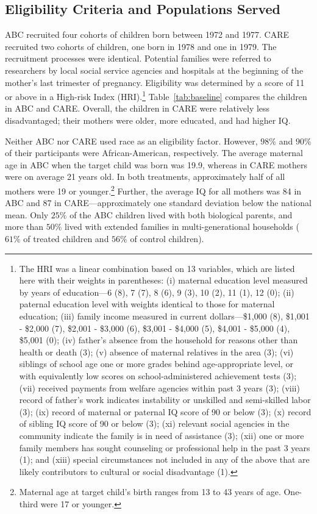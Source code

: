 \subsection{Eligibility Criteria and Populations Served} \label{section:eligibility}

\noindent ABC recruited four cohorts of children born between 1972 and 1977. CARE recruited two cohorts of children, one born in 1978 and one in 1979. The recruitment processes were identical. Potential families were referred to researchers by local social service agencies and hospitals at the beginning of the mother's last trimester of pregnancy. Eligibility was determined by a score of 11 or above in a High-risk Index (HRI).\footnote{The HRI was a linear combination based on 13 variables, which are listed here with their weights in parentheses: (i) maternal education level measured by years of education---6 (8), 7 (7), 8 (6), 9 (3), 10 (2), 11 (1), 12 (0); (ii) paternal education level with weights identical to those for maternal education; (iii) family income measured in current dollars---\$1,000 (8), \$1,001 - \$2,000 (7), \$2,001 - \$3,000 (6), \$3,001 - \$4,000 (5), \$4,001 - \$5,000 (4), \$5,001 (0); (iv) father's absence from the household for reasons other than health or death (3); (v) absence of maternal relatives in the area (3); (vi) siblings of school age one or more grades behind age-appropriate level, or with equivalently low scores on school-administered achievement tests (3); (vii) received payments from welfare agencies within past 3 years (3); (viii) record of father's work indicates instability or unskilled and semi-skilled labor (3); (ix) record of maternal or paternal IQ score of 90 or below (3); (x) record of sibling IQ score of 90 or below (3); (xi) relevant social agencies in the community indicate the family is in need of assistance (3); (xii) one or more family members has sought counseling or professional help in the past 3 years (1); and (xiii) special circumstances not included in any of the above that are likely contributors to cultural or social disadvantage (1).} Table~\ref{tab:baseline} compares the children in ABC and CARE. Overall, the children in CARE were relatively less disadvantaged; their mothers were older, more educated, and had higher IQ.



\noindent Neither ABC nor CARE used race as an eligibility factor. However, $98\%$ and $90\%$ of their participants were African-American, respectively. The average maternal age in ABC when the target child was born was 19.9, whereas in CARE mothers were on average 21 years old. In both treatments, approximately half of all mothers were 19 or younger.\footnote{Maternal age at target child's birth ranges from 13 to 43 years of age. One-third were 17 or younger.} Further, the average IQ for all mothers was 84 in ABC and 87 in CARE---approximately one standard deviation below the national mean. Only $25\%$ of the ABC children lived with both biological parents, and more than $50\%$ lived with extended families in multi-generational households ($61\%$ of treated children and $56\%$ of control children).\\

